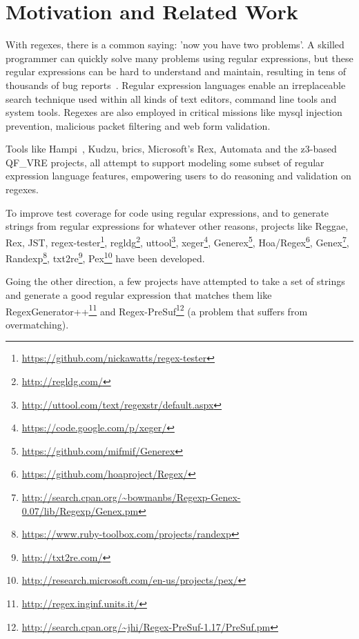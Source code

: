 \section{Motivation and Related Work}
\label{sec:motivation}

With regexes, there is a common saying: 'now you have two problems'.
A skilled programmer can quickly solve many problems using regular expressions, but these regular expressions can be hard to understand and maintain, resulting in tens of thousands of bug reports~\cite{Spishak:2012:TSR:2318202.2318207}.
Regular expression languages enable an irreplaceable search technique used within all kinds of text editors, command line tools and system tools.
Regexes are also employed in critical missions like mysql injection prevention, malicious packet filtering  and web form validation.

Tools like Hampi~\cite{hampi}, Kudzu, brics\cite{brics}, Microsoft's Rex, Automata and the z3-based QF\_VRE projects, all attempt to support modeling some subset of regular expression language features, empowering users to do reasoning and validation on regexes.

To improve test coverage for code using regular expressions, and to generate strings from regular expressions for whatever other reasons, projects like Reggae, Rex, JST, regex-tester\footnote{\url{https://github.com/nickawatts/regex-tester}}, regldg\footnote{\url{http://regldg.com/}},
uttool\footnote{\url{http://uttool.com/text/regexstr/default.aspx}}, xeger\footnote{\url{https://code.google.com/p/xeger/}}, Generex\footnote{\url{https://github.com/mifmif/Generex}}, Hoa/Regex\footnote{\url{https://github.com/hoaproject/Regex/}}, Genex\footnote{\url{http://search.cpan.org/~bowmanbs/Regexp-Genex-0.07/lib/Regexp/Genex.pm}}, Randexp\footnote{\url{https://www.ruby-toolbox.com/projects/randexp}}, txt2re\footnote{\url{http://txt2re.com/}}, Pex\footnote{\url{http://research.microsoft.com/en-us/projects/pex/}}  have been developed.

Going the other direction, a few projects have attempted to take a set of strings and generate a good regular expression that matches them like RegexGenerator++\footnote{\url{http://regex.inginf.units.it/}} and Regex-PreSuf\footnote{\url{http://search.cpan.org/~jhi/Regex-PreSuf-1.17/PreSuf.pm}} (a problem that suffers from overmatching).

